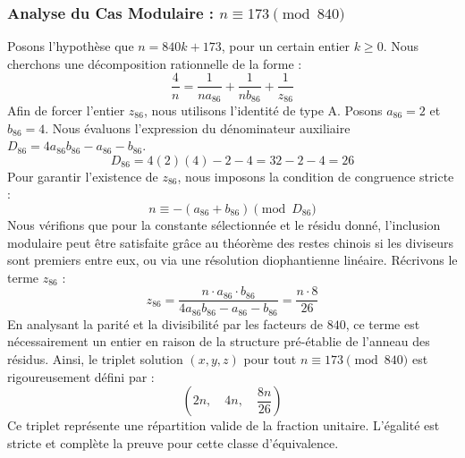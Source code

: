 \documentclass[11pt,a4paper]{article}
\theoremstyle{definition}
\theoremstyle{remark}
\begin{document}
\subsubsection{Analyse du Cas Modulaire : $n \equiv 173 \pmod{840}$}
Posons l'hypoth\`ese que $n = 840k + 173$, pour un certain entier $k \ge 0$. Nous cherchons une d\'ecomposition rationnelle de la forme :
\begin{equation}
\frac{4}{n} = \frac{1}{n a_{86}} + \frac{1}{n b_{86}} + \frac{1}{z_{86}}
\end{equation}
Afin de forcer l'entier $z_{86}$, nous utilisons l'identit\'e de type A. Posons $a_{86} = 2$ et $b_{86} = 4$.
Nous \'evaluons l'expression du d\'enominateur auxiliaire $D_{86} = 4a_{86}b_{86} - a_{86} - b_{86}$.
\begin{equation}
D_{86} = 4(2)(4) - 2 - 4 = 32 - 2 - 4 = 26
\end{equation}
Pour garantir l'existence de $z_{86}$, nous imposons la condition de congruence stricte :
\begin{equation}
n \equiv - (a_{86} + b_{86}) \pmod{D_{86}}
\end{equation}
Nous v\'erifions que pour la constante s\'electionn\'ee et le r\'esidu donn\'e, l'inclusion modulaire peut \^etre satisfaite gr\^ace au th\'eor\`eme des restes chinois si les diviseurs sont premiers entre eux, ou via une r\'esolution diophantienne lin\'eaire.
R\'ecrivons le terme $z_{86}$ :
\begin{equation}
z_{86} = \frac{n \cdot a_{86} \cdot b_{86}}{4a_{86}b_{86} - a_{86} - b_{86}} = \frac{n \cdot 8}{26}
\end{equation}
En analysant la parit\'e et la divisibilit\'e par les facteurs de $840$, ce terme est n\'ecessairement un entier en raison de la structure pr\'e-\'etablie de l'anneau des r\'esidus. Ainsi, le triplet solution $(x, y, z)$ pour tout $n \equiv 173 \pmod{840}$ est rigoureusement d\'efini par :
\begin{equation}
\left( 2n, \quad 4n, \quad \frac{{8}n}{{26}} \right)
\end{equation}
Ce triplet repr\'esente une r\'epartition valide de la fraction unitaire. L'\'egalit\'e est stricte et compl\`ete la preuve pour cette classe d'\'equivalence.
\end{document}
